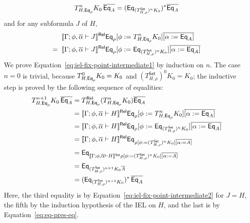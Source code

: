 \documentclass{lmcs}
\theoremstyle{plain}\newtheorem{satz}[thm]{Satz}
\newcommand{\set}{\mathsf{Set}}
\begin{document}
{\begin{itemize}
\begin{equation}
T^n_{H, \Eq_{\rho}} K_0\, \ol{\Eq_A} = (\Eq_{(T^\set_{H, \rho})^n K_0})^*
\ol{\Eq_A}
\end{equation}
and for any subformula $J$ of $H$,
\begin{equation}\label{eq:iel-fix-point-intermediate2}
\begin{split}
& \relsem{\Gamma; \phi, \ol{\alpha} \vdash J} \Eq_{\rho} [\phi
    := T^{n}_{H,\Eq_{\rho}} K_0] \overline{[\alpha := \Eq_A]} \\
=\;\; & \relsem{\Gamma; \phi, \ol{\alpha} \vdash J} \Eq_{\rho}
[\phi := \Eq_{(T^\set_{H,\rho})^n K_0}] \overline{[\alpha := \Eq_A]}
\end{split}
\end{equation}
We prove Equation~\ref{eq:iel-fix-point-intermediate1} by induction on
$n$.  The case $n=0$ is trivial, because $T^0_{H,\mathsf{Eq}_{\rho}} K_0 =
K_0$ and $(T^\set_{H,\rho})^0 K_0 = K_0$; the inductive step is proved
by the following sequence of equalities:
\[
\begin{split}
T^{n+1}_{H,\Eq_{\rho}} K_0\, \overline{\Eq_A}
&= T^\rel_{H,\Eq_{\rho}} (T^{n}_{H,\Eq_{\rho}} K_0)
\overline{\Eq_A} \\ 
&= \relsem{\Gamma; \phi, \ol{\alpha} \vdash H} \Eq_{\rho} [\phi
  := T^{n}_{H, \Eq_{\rho}} K_0] \overline{[\alpha :=
    \Eq_A]} \\ 
&= \relsem{\Gamma; \phi, \ol{\alpha} \vdash H} \Eq_{\rho} [\phi
  := \Eq_{(T^\set_{H,\rho})^n K_0}] \overline{[\alpha :=
    \Eq_A]} \\ 
&= \relsem{\Gamma; \phi, \ol{\alpha} \vdash H} \Eq_{\rho [\phi
    := (T^\set_{H,\rho})^n K_0] \overline{[\alpha :=
      A]}} \\ 
&= \Eq_{\setsem{\Gamma; \phi, \ol{\alpha} \vdash H} \rho [\phi
    := (T^\set_{H,\rho})^n K_0] \overline{[\alpha :=
      A]}} \\ 
&= \Eq_{(T^\set_{H,\rho})^{n+1} K_0 \overline{A}} \\ 
&= (\Eq_{(T^\set_{H,\rho})^{n+1} K_0})^*\, \overline{\Eq_A} 
\end{split}
\]
Here, the third equality is by
Equation~\ref{eq:iel-fix-point-intermediate2} for $J = H$, the fifth
by the induction hypothesis of the IEL on $H$, and the last is by
Equation~\ref{eq:eq-pres-eq}.

\vspace*{0.1in}


\end{itemize}}
\end{document}
